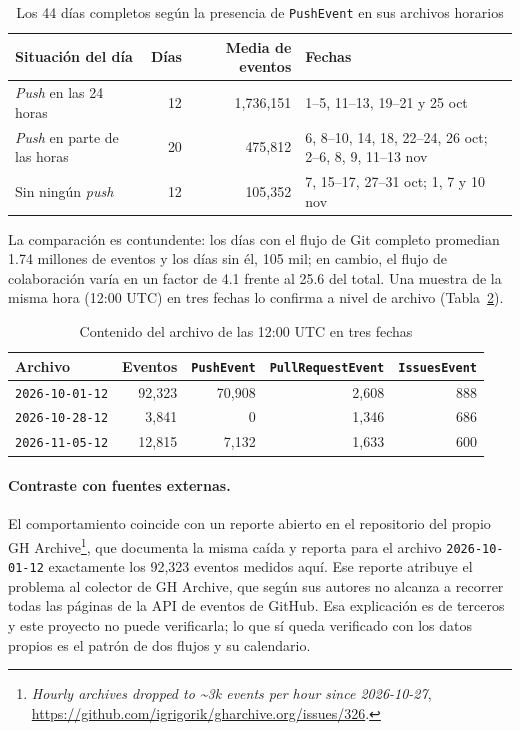 \begin{table}[H]
\centering
\caption{Los 44 días completos según la presencia de \texttt{PushEvent} en sus archivos horarios}
\label{tab:cobertura}
\vspace{0.2cm}
\small
\begin{tabular}{@{}p{5.2cm}rrp{4.6cm}@{}}
\toprule
\textbf{Situación del día} & \textbf{Días} & \textbf{Media de eventos} & \textbf{Fechas} \\
\midrule
\textit{Push} en las 24 horas        & 12 & 1,736,151 & 1--5, 11--13, 19--21 y 25 oct \\
\textit{Push} en parte de las horas  & 20 &   475,812 & 6, 8--10, 14, 18, 22--24, 26 oct; 2--6, 8, 9, 11--13 nov \\
Sin ningún \textit{push}             & 12 &   105,352 & 7, 15--17, 27--31 oct; 1, 7 y 10 nov \\
\bottomrule
\end{tabular}
\end{table}

La comparación es contundente: los días con el flujo de Git completo promedian 1.74 millones de eventos y los días sin él, 105 mil; en cambio, el flujo de colaboración varía en un factor de 4.1 frente al 25.6 del total. Una muestra de la misma hora (12:00 UTC) en tres fechas lo confirma a nivel de archivo (Tabla~\ref{tab:muestra-horas}).

\begin{table}[H]
\centering
\caption{Contenido del archivo de las 12:00 UTC en tres fechas}
\label{tab:muestra-horas}
\vspace{0.2cm}
\footnotesize
\begin{tabular}{@{}lrrrr@{}}
\toprule
\textbf{Archivo} & \textbf{Eventos} & \texttt{PushEvent} & \texttt{PullRequestEvent} & \texttt{IssuesEvent} \\
\midrule
\texttt{2026-10-01-12} & 92,323 & 70,908 & 2,608 & 888 \\
\texttt{2026-10-28-12} &  3,841 &      0 & 1,346 & 686 \\
\texttt{2026-11-05-12} & 12,815 &  7,132 & 1,633 & 600 \\
\bottomrule
\end{tabular}
\end{table}

\paragraph{Contraste con fuentes externas.} El comportamiento coincide con un reporte abierto en el repositorio del propio GH Archive\footnote{\textit{Hourly archives dropped to \textasciitilde 3k events per hour since 2026-10-27}, \url{https://github.com/igrigorik/gharchive.org/issues/326}.}, que documenta la misma caída y reporta para el archivo \texttt{2026-10-01-12} exactamente los 92,323 eventos medidos aquí. Ese reporte atribuye el problema al colector de GH Archive, que según sus autores no alcanza a recorrer todas las páginas de la API de eventos de GitHub. Esa explicación es de terceros y este proyecto no puede verificarla; lo que sí queda verificado con los datos propios es el patrón de dos flujos y su calendario.

